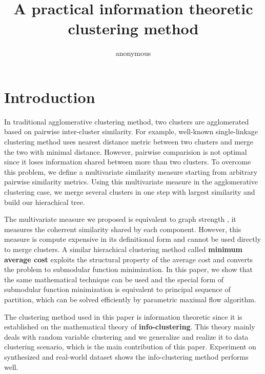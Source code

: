 \documentclass{article}
\title{A practical information theoretic clustering method}
\author{
  anonymous
}
\begin{document}

\maketitle

\begin{abstract}

\end{abstract}

\section{Introduction}
In traditional agglomerative clustering method, two clusters are agglomerated based on pairwise inter-cluster similarity.  For example, well-known single-linkage clustering method uses nearest distance metric between two clusters and merge the two with minimal distance\cite{RN16}.  However, pairwise comparision is not optimal since it loses information shared between more than two clusters.  To overcome this problem, we define a multivariate similarity measure starting from arbitrary pairwise similarity metrics. Using this multivariate measure in the agglomerative clustering case, we merge several clusters in one step with largest similarity and build our hierachical tree.

The multivariate measure we proposed is equivalent to graph strength \cite{RN12}, it measures the coherrent similarity shared by each component. However, this measure is compute expensive in its definitional form and cannot be used directly to merge clusters. A similar hierachical clustering method called \textbf{minimum average cost} exploits the structural property of the average cost and converts the problem to submodular function minimization\cite{RN7}. In this paper, we show that the same mathematical technique can be used and the special form of submodular function minimization is equivalent to principal sequence of partition\cite{RN3}, which can be solved efficiently by parametric maximal flow algorithm\cite{RN4}. 

The clustering method used in this paper is information theoretic since it is established on the mathematical theory of \textbf{info-clustering}\cite{RN1}. This theory mainly deals with random variable clustering and we generalize and realize it to data clustering scenario, which is the main contribution of this paper. Experiment on synthesized and real-world dataset shows the info-clustering method performs well. 
\end{document}
